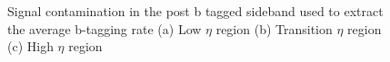 \begin{figure}[Htcb]
\begin{center}
\\
\\
\caption{
Signal contamination in the post b tagged sideband used to extract the average b-tagging rate
(a) Low $\eta$ region  
(b) Transition $\eta$ region 
(c) High $\eta$ region 
}
\label{figs:trsigcont}
\end{center}
\end{figure}

